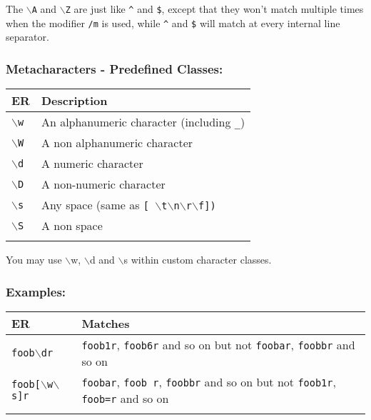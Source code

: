 The \texttt{$\backslash$A} and \texttt{$\backslash$Z} are just like
\texttt{\^{}} and \texttt{\$}, except that they won't match multiple
times when the modifier \texttt{/m} is used, while \texttt{\^{}} and
\texttt{\$} will match at every internal line separator.


\subsubsection{Metacharacters - Predefined Classes:}

\begin{footnotesize}
  \begin{tabularx}{\textwidth}{>{\hsize=0.3\hsize}X>{\hsize=0.7\hsize}X}\\
    \hline
    \textbf{ER} & \textbf{Description} \\
    \hline
    \texttt{$\backslash$w} & An alphanumeric character (including \texttt{\_}) \\
    \hline
    \texttt{$\backslash$W} & A non alphanumeric character \\
    \texttt{$\backslash$d} & A numeric character \\
    \texttt{$\backslash$D} & A non-numeric character \\
    \texttt{$\backslash$s} & Any space (same as \texttt{[ $\backslash$t$\backslash$n$\backslash$r$\backslash$f])} \\
    \texttt{$\backslash$S} & A non space \\
    \hline
    \\
  \end{tabularx}
\end{footnotesize}

You may use $\backslash$w, $\backslash$d and $\backslash$s within
custom character classes.


\newpage
\subsubsection{Examples:}

\begin{footnotesize}
  \begin{tabularx}{\textwidth}{>{\hsize=0.2\hsize}X>{\hsize=0.9\hsize}X}\\
    \hline
    \textbf{ER} & \textbf{Matches} \\
    \hline
    \texttt{foob$\backslash$dr} & \texttt{foob1r}, \texttt{foob6r} and so on but not \texttt{foobar}, \texttt{foobbr} and so on \\
    \texttt{foob[$\backslash$w$\backslash$s]r} & \texttt{foobar}, \texttt{foob r}, \texttt{foobbr} and so on but not \texttt{foob1r}, \texttt{foob=r} and so on \\
    \hline
    \\
  \end{tabularx}
\end{footnotesize}


